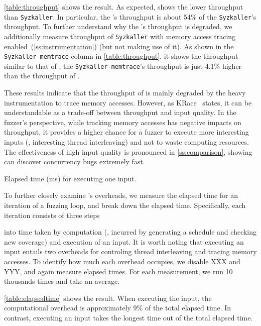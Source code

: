 \autoref{table:throughput} shows the result. As expected, \sys shows
the lower throughput than \texttt{Syzkaller}. In particular, the
\sys's throughput is about 54\% of the \texttt{Syzkaller}'s
throughput.
%
To further understand why the \sys's throughput is degraded, we
additionally measure throughput of \texttt{Syzkaller} with memory
access tracing enabled~(\autoref{ss:instrumentation}) (but not making
use of it).
%
As shown in the \texttt{Syzkaller-memtrace} column in
\autoref{table:throughput}, it shows the throughput similar to that of
\sys; the \texttt{Syzkaller-memtrace}'s throughput is just 4.1\%
higher than the throughput of \sys.


These results indicate that the throughput of \sys is mainly degraded
by the heavy instrumentation to trace memory accesses.
%
However, as KRace~\cite{krace} states, it can be understandable as a
trade-off between throughput and input quality.
%
In the fuzzer's perspective, while tracking memory accesses has
negative impacts on throughput, it provides a higher chance for a
fuzzer to execute more interesting inputs (\ie, interesting thread
interleaving) and not to waste computing resources.
%
The effectiveness of high input quality is pronounced in
\autoref{ss:comparison}, showing \sys can discover concurrency bugs
extremely fast.




%
\begin{table}[t]
  \centering
  
  \caption{ Elapsed time (ms) for executing one input.}
  \label{table:elapsedtime}
\end{table}
%
To further closely examine \sys's overheads, we measure the elapsed
time for an iteration of a fuzzing loop, and break down the elapsed
time.
%
Specifically, each iteration consists of three steps

into time taken by computation (\ie, incurred by generating a
schedule and checking new coverage) and execution of an input.
%
It is worth noting that executing an input entails two overheads for
controling thread interleaving and tracing memory accesses. To
identify how much each overhead occupies, we disable XXX and YYY, and
again measure elapsed times.
%
For each measurement, we run 10 thousands times and take an average.

\autoref{table:elapsedtime} shows the result. When executing the
input, the computational overhead is approximately 9\% of the total
elapsed time. In contrast, executing an input takes the longest time
out of the total elapsed time.
\dr{}



